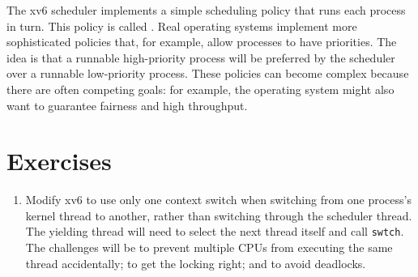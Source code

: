 The xv6 scheduler implements a simple scheduling policy that runs each process
in turn.  This policy is called
.
Real operating systems implement more sophisticated policies that, for example,
allow processes to have priorities.  The idea is that a runnable high-priority process
will be preferred by the scheduler over a runnable low-priority process.   These
policies can become complex because there are often competing goals: for
example, the operating system might also want to guarantee fairness and
high throughput.

\section{Exercises}

\begin{enumerate}

\item Modify xv6 to use only one context switch when switching from
  one process's kernel thread to another, rather than switching
  through the scheduler thread. The yielding thread will need to select
  the next thread itself and call \texttt{swtch}. The challenges will
  be to prevent multiple CPUs from executing the same thread accidentally;
  to get the locking right; and to avoid deadlocks.

\end{enumerate}
